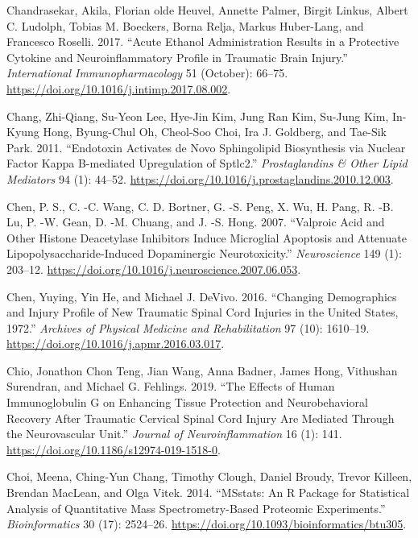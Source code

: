 \documentclass[9pt,lineno]{elife}
\newlength{\cslhangindent}
\newlength{\cslentryspacingunit} %
\newenvironment{CSLReferences}[2] %
 {%
  \setlength{\parindent}{0pt}
  \ifodd #1
  \let\oldpar\par
  \def\par{\hangindent=\cslhangindent\oldpar}
  \fi
  \setlength{\parskip}{#2\cslentryspacingunit}
 }%
 {}
\begin{document}
\begin{landscape}
\begin{landscape}
\begin{landscape}
\begin{landscape}
\begin{CSLReferences}{1}{0}
\leavevmode{}%
Chandrasekar, Akila, Florian olde Heuvel, Annette Palmer, Birgit Linkus, Albert C. Ludolph, Tobias M. Boeckers, Borna Relja, Markus Huber-Lang, and Francesco Roselli. 2017. {``Acute Ethanol Administration Results in a Protective Cytokine and Neuroinflammatory Profile in Traumatic Brain Injury.''} \emph{International Immunopharmacology} 51 (October): 66--75. \url{https://doi.org/10.1016/j.intimp.2017.08.002}.

\leavevmode{}%
Chang, Zhi-Qiang, Su-Yeon Lee, Hye-Jin Kim, Jung Ran Kim, Su-Jung Kim, In-Kyung Hong, Byung-Chul Oh, Cheol-Soo Choi, Ira J. Goldberg, and Tae-Sik Park. 2011. {``Endotoxin Activates de Novo Sphingolipid Biosynthesis via Nuclear Factor Kappa {B-mediated} Upregulation of {Sptlc2}.''} \emph{Prostaglandins \& Other Lipid Mediators} 94 (1): 44--52. \url{https://doi.org/10.1016/j.prostaglandins.2010.12.003}.

\leavevmode{}%
Chen, P. S., C. -C. Wang, C. D. Bortner, G. -S. Peng, X. Wu, H. Pang, R. -B. Lu, P. -W. Gean, D. -M. Chuang, and J. -S. Hong. 2007. {``Valproic Acid and Other Histone Deacetylase Inhibitors Induce Microglial Apoptosis and Attenuate Lipopolysaccharide-Induced Dopaminergic Neurotoxicity.''} \emph{Neuroscience} 149 (1): 203--12. \url{https://doi.org/10.1016/j.neuroscience.2007.06.053}.

\leavevmode{}%
Chen, Yuying, Yin He, and Michael J. DeVivo. 2016. {``Changing {Demographics} and {Injury Profile} of {New Traumatic Spinal Cord Injuries} in the {United States}, 1972.''} \emph{Archives of Physical Medicine and Rehabilitation} 97 (10): 1610--19. \url{https://doi.org/10.1016/j.apmr.2016.03.017}.

\leavevmode{}%
Chio, Jonathon Chon Teng, Jian Wang, Anna Badner, James Hong, Vithushan Surendran, and Michael G. Fehlings. 2019. {``The Effects of Human Immunoglobulin {G} on Enhancing Tissue Protection and Neurobehavioral Recovery After Traumatic Cervical Spinal Cord Injury Are Mediated Through the Neurovascular Unit.''} \emph{Journal of Neuroinflammation} 16 (1): 141. \url{https://doi.org/10.1186/s12974-019-1518-0}.

\leavevmode{}%
Choi, Meena, Ching-Yun Chang, Timothy Clough, Daniel Broudy, Trevor Killeen, Brendan MacLean, and Olga Vitek. 2014. {``{MSstats}: An {R} Package for Statistical Analysis of Quantitative Mass Spectrometry-Based Proteomic Experiments.''} \emph{Bioinformatics} 30 (17): 2524--26. \url{https://doi.org/10.1093/bioinformatics/btu305}.


\end{CSLReferences}
\end{landscape}
\end{landscape}
\end{landscape}
\end{landscape}
\end{document}
